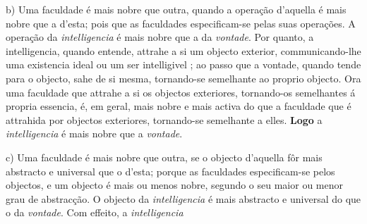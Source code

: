 b) Uma faculdade é mais nobre que outra, quando a operação d'aquella é mais nobre que a d'esta; pois que as faculdades  especificam-se pelas suas operações. A operação da \emph{intelligencia} é mais nobre que a da \emph{vontade}. Por quanto, a intelligencia, quando entende, attrahe a si um objecto exterior, communicando-lhe uma existencia ideal ou um ser intelligivel  ; ao passo que a vontade, quando tende para o objecto, sahe de si mesma, tornando-se semelhante ao proprio objecto. Ora uma faculdade que attrahe a si os objectos exteriores,   tornando-os semelhantes á propria essencia, é, em geral, mais nobre e mais activa do que a faculdade que é attrahida por objectos exteriores, tornando-se semelhante a elles. \textbf{Logo} a \emph{intelligencia} é mais nobre que a \emph{vontade}. 

c) Uma faculdade é mais nobre que outra, se o objecto d'aquella fôr mais abstracto e universal que o d'esta; porque as faculdades especificam-se pelos objectos, e um objecto é mais ou menos nobre, segundo o seu maior ou menor grau   de abstracção. O objecto da \emph{intelligencia} é mais abstracto e universal do que o da \emph{vontade}. Com effeito, a \emph{intelligencia}

